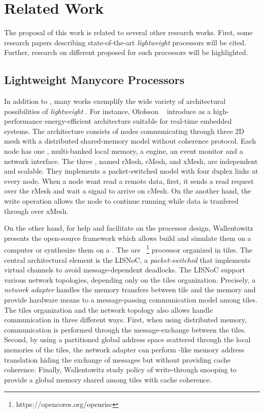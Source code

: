 \chapter{Related Work}
\label{ch.related-works}

The proposal of this work is related to several other research works.
First, some research papers describing state-of-the-art \textit{lightweight} \manycores
processors will be cited. Further, research on different \oss
proposed for such processors will be highlighted.

\section{Lightweight Manycore Processors}
\label{sec.works.manycores}

	In addition to \mppa, many works exemplify the wide variety of architectural
	possibilities of \textit{lightweight} \manycores.
	For instance, Olofsson \etal~\cite{olofsson2014} introduce \epiphany as a
	high-performance energy-efficient \manycore architecture suitable for
	real-time embedded systems.
	The architecture consists of nodes communicating through three 2D mesh \nocs
	with a distributed shared-memory model without coherence protocol.
	Each node has one \risc \cpu, multi-banked local memory, a \dma engine,
	an event monitor and a network interface.
	The three \nocs, named rMesh, cMesh, and xMesh, are independent and scalable.
	They implements a packet-switched model with four duplex links at every node.
	When a node want read a remote data, first, it sends a read request over the rMesh
	and wait a signal to arrive on cMesh.
	On the another hand, the write operation allows the node to continue running
	while data is tranfered through over xMesh.

	On the other hand, for help and facilitate on the \manycore processor design,
	Wallentowitz \etal~\cite{Wallentowitz2013} presents the open-source framework
	\optimsoc which allows build \manycore \soc and simulate them on a computer or
	synthesize them on a \fpga.
	The \pe are \openrisc~\footnote{https://opencores.org/openrisc}
	processor organized in tiles.
	The central architectural element is the LISNoC, a \textit{packet-switched \noc}
	that implements virtual channels to avoid message-dependent deadlocks.
	The LISNoC support various network topologies, depending only on the tiles organization.
	Precisely, a \textit{network adapter} handles the memory transfers between
	tile and the memory and provide hardware means to a message-passing communication
	model among tiles.
	The tiles organization and the network topology also allows handle communication
	in three different ways.
	First, when using distributed memory, communication is performed through the
	message-exchange between the tiles.
	Second, by using a partitioned global address space scattered through the
	local memories of the tiles, the network adapter can perform \mpu-like memory
	address translation hiding the exchange of messages but without providing cache coherence.
	Finally, Wallentowitz \etal study policy of write-through snooping to provide
	a global memory shared among tiles with cache coherence.

